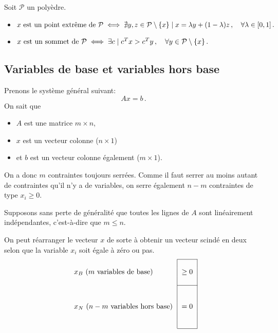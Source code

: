 	Soit $\mathcal{P}$ un polyèdre.

	\begin{itemize}
		\item $\textnormal{$x$ est un point extrême de $\mathcal{P}$}
		\iff \nexists y,z \in \mathcal{P} \setminus \{x\} \suchthat x = \lambda y + (1 - \lambda) z\,,
		\quad \forall \lambda \in \interval{0}{1}\,.$
		\item $\textnormal{$x$ est un sommet de $\mathcal{P}$}
		\iff \exists c \suchthat c^T x > c^T y\,,
		\quad \forall y \in \mathcal{P} \setminus \{x\} \,.$
	\end{itemize}

\subsection{Variables de base et variables hors base}

	Prenons le système général suivant:
	\[
	Ax = b\,.
	\]
	On sait que

	\begin{itemize}
		\item $A$ est une matrice $m \times n$,
		\item $x$ est un vecteur colonne ($n \times 1$)
		\item et $b$ est un vecteur colonne également ($m \times 1$).
	\end{itemize}

	On a donc $m$ contraintes toujours serrées.
	Comme il faut serrer au moins autant de contraintes
	qu'il n'y a de variables,
	on serre également $n-m$ contraintes de type $x_i \ge 0$.

	Supposons sans perte de généralité que toutes les lignes de $A$
	sont linéairement indépendantes,
	c'est-à-dire que $m \le n$.

	On peut réarranger le vecteur $x$ de sorte à obtenir
	un vecteur scindé en deux selon que
	la variable $x_i$ soit égale à zéro ou pas.
	\[
	\begin{tabular}{l|c|}
		\cline{2-2}
		\multirow{3}{*}{$\xb$ ($m$ variables de base)} & \multirow{3}{*}{$\ge 0$}\\
		& \\
		& \\
		\cline{2-2}
		\multirow{5}{*}{$\xn$ ($n-m$ variables hors base)} & \multirow{5}{*}{$= 0$}\\
		& \\
		& \\
		& \\
		& \\
		\cline{2-2}
	\end{tabular}
	\]

